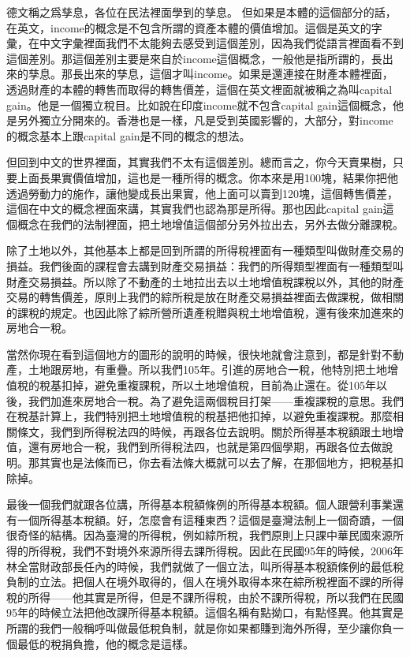 \documentclass[oneside,sub3section]{ctexbook}
\begin{document}
德文稱之爲孳息，各位在民法裡面學到的孳息。
但如果是本體的這個部分的話，在英文，income的概念是不包含所謂的資產本體的價值增加。這個是英文的字彙，在中文字彙裡面我們不太能夠去感受到這個差別，因為我們從語言裡面看不到這個差別。那這個差別主要是來自於income這個概念，一般他是指所謂的，長出來的孳息。那長出來的孳息，這個才叫income。如果是還連接在財產本體裡面，透過財產的本體的轉售而取得的轉售價差，這個在英文裡面就被稱之為叫capital gain。他是一個獨立稅目。比如說在印度income就不包含capital gain這個概念，他是另外獨立分開來的。香港也是一樣，凡是受到英國影響的，大部分，對income的概念基本上跟capital gain是不同的概念的想法。

但回到中文的世界裡面，其實我們不太有這個差別。總而言之，你今天賣果樹，只要上面長果實價值增加，這也是一種所得的概念。你本來是用100塊，結果你把他透過勞動力的施作，讓他變成長出果實，他上面可以賣到120塊，這個轉售價差，這個在中文的概念裡面來講，其實我們也認為那是所得。那也因此capital gain這個概念在我們的法制裡面，把土地增值這個部分另外拉出去，另外去做分離課稅。

除了土地以外，其他基本上都是回到所謂的所得稅裡面有一種類型叫做財產交易的損益。我們後面的課程會去講到財產交易損益：我們的所得類型裡面有一種類型叫財產交易損益。所以除了不動產的土地拉出去以土地增值稅課稅以外，其他的財產交易的轉售價差，原則上我們的綜所稅是放在財產交易損益裡面去做課稅，做相關的課稅的規定。也因此除了綜所營所遺產稅贈與稅土地增值稅，還有後來加進來的房地合一稅。

當然你現在看到這個地方的圖形的說明的時候，很快地就會注意到，都是針對不動產，土地跟房地，有重疊。所以我們105年。引進的房地合一稅，他特別把土地增值稅的稅基扣掉，避免重複課稅，所以土地增值稅，目前為止還在。從105年以後，我們加進來房地合一稅。為了避免這兩個稅目打架------重複課稅的意思。我們在稅基計算上，我們特別把土地增值稅的稅基把他扣掉，以避免重複課稅。那麼相關條文，我們到所得稅法四的時候，再跟各位去說明。關於所得基本稅額跟土地增值，還有房地合一稅，我們到所得稅法四，也就是第四個學期，再跟各位去做說明。那其實也是法條而已，你去看法條大概就可以去了解，在那個地方，把稅基扣除掉。

最後一個我們就跟各位講，所得基本稅額條例的所得基本稅額。個人跟營利事業還有一個所得基本稅額。好，怎麼會有這種東西？這個是臺灣法制上一個奇蹟，一個很奇怪的結構。因為臺灣的所得稅，例如綜所稅，我們原則上只課中華民國來源所得的所得稅，我們不對境外來源所得去課所得稅。因此在民國95年的時候，2006年林全當財政部長任內的時候，我們就做了一個立法，叫所得基本稅額條例的最低稅負制的立法。把個人在境外取得的，個人在境外取得本來在綜所稅裡面不課的所得稅的所得------他其實是所得，但是不課所得稅，由於不課所得稅，所以我們在民國95年的時候立法把他改課所得基本稅額。這個名稱有點拗口，有點怪異。他其實是所謂的我們一般稱呼叫做最低稅負制，就是你如果都賺到海外所得，至少讓你負一個最低的稅捐負擔，他的概念是這樣。
\end{document}
